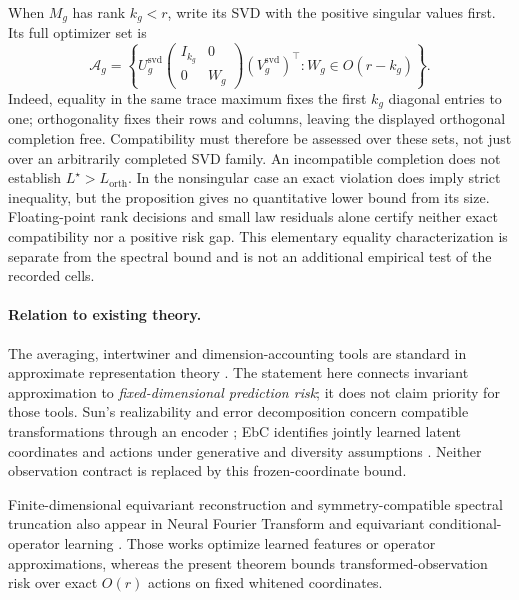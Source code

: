 When $M_g$ has rank $k_g<r$, write its SVD with the positive singular values first. Its full optimizer set is
\[
 \mathcal A_g=
 \left\{U_g^{\mathrm{svd}}
 \begin{pmatrix}I_{k_g}&0\\0&W_g\end{pmatrix}
 (V_g^{\mathrm{svd}})^\top:
 W_g\in O(r-k_g)\right\}.
\]
Indeed, equality in the same trace maximum fixes the first $k_g$ diagonal entries to one; orthogonality fixes their rows and columns, leaving the displayed orthogonal completion free. Compatibility must therefore be assessed over these sets, not just over an arbitrarily completed SVD family. An incompatible completion does not establish $L^\star>L_{\mathrm{orth}}$. In the nonsingular case an exact violation does imply strict inequality, but the proposition gives no quantitative lower bound from its size. Floating-point rank decisions and small law residuals alone certify neither exact compatibility nor a positive risk gap. This elementary equality characterization is separate from the spectral bound and is not an additional empirical test of the recorded cells.

\paragraph{Relation to existing theory.}
\label{sp:positioning}
The averaging, intertwiner and dimension-accounting tools are standard in approximate representation theory \citep{gowers2017inverse,moore2015approximate}. The statement here connects invariant approximation to \emph{fixed-dimensional prediction risk}; it does not claim priority for those tools. Sun's realizability and error decomposition concern compatible transformations through an encoder \citep{sun2026transformationlaws}; EbC identifies jointly learned latent coordinates and actions under generative and diversity assumptions \citep{schmidt2025equivariance}. Neither observation contract is replaced by this frozen-coordinate bound.

Finite-dimensional equivariant reconstruction and symmetry-compatible spectral truncation also appear in Neural Fourier Transform and equivariant conditional-operator learning \citep{koyama2024fourier,ordonez2026inference}. Those works optimize learned features or operator approximations, whereas the present theorem bounds transformed-observation risk over exact $O(r)$ actions on fixed whitened coordinates.

